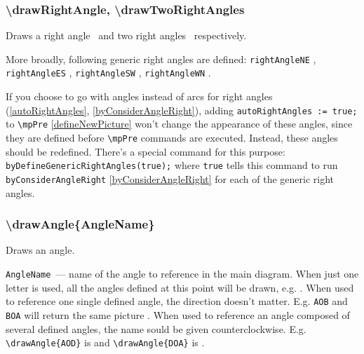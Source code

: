 


\subsubsection{\textbackslash drawRightAngle, \textbackslash drawTwoRightAngles}
	Draws a right angle \drawRightAngle\ and two right angles \drawTwoRightAngles\ respectively. 
	
	More broadly, following generic right angles are defined: \texttt{rightAngleNE} ,  \texttt{rightAngleES} ,  \texttt{rightAngleSW} ,  \texttt{rightAngleWN} . 
	
	If you choose to go with angles instead of arcs for right angles (\ref{autoRightAngles}, \ref{byConsiderAngleRight}), adding \texttt{autoRightAngles := true;} to \texttt{\textbackslash mpPre} \ref{defineNewPicture} won't change the appearance of these angles, since they are defined before \texttt{\textbackslash mpPre} commands are executed. Instead, these angles should be redefined. There's a special command for this purpose: \texttt{byDefineGenericRightAngles(true);} where \texttt{true} tells this command to run \texttt{byConsiderAngleRight} \ref{byConsiderAngleRight} for each of the generic right angles.

\subsubsection{\textbackslash drawAngle\{AngleName\}}\label{drawAngle}

	Draws an angle.
	

	\texttt{AngleName}~— name of the angle to reference in the main diagram. 
	When just one letter is used, all the angles defined at this point will be drawn, e.g. . When used to reference one single defined angle, the direction doesn't matter. 
	E.g. \texttt{AOB} and \texttt{BOA} will return the same picture . 
	When used to reference an angle composed of several defined angles, the name sould be given counterclockwise. 
	E.g. \texttt{\textbackslash drawAngle\{AOD\}} is  and \texttt{\textbackslash drawAngle\{DOA\}} is .
	
